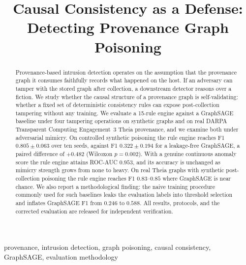 \documentclass[conference]{IEEEtran}
\begin{document}
\title{Causal Consistency as a Defense: Detecting Provenance Graph Poisoning}

\author{
}

\maketitle

\begin{abstract}
Provenance-based intrusion detection operates on the assumption that the
provenance graph it consumes faithfully records what happened on the host. If an
adversary can tamper with the stored graph after collection, a downstream
detector reasons over a fiction. We study whether the causal structure of a
provenance graph is self-validating: whether a fixed set of deterministic
consistency rules can expose post-collection tampering without any training.
We evaluate a 15-rule engine against a GraphSAGE baseline under four tampering
operations on synthetic graphs and on real DARPA Transparent Computing
Engagement~3 Theia provenance, and we examine both under adversarial mimicry.
On controlled synthetic poisoning the rule engine reaches F1
$0.805\pm0.063$ over ten seeds, against F1 $0.322\pm0.194$ for a leakage-free
GraphSAGE, a paired difference of $+0.482$ (Wilcoxon $p=0.002$). With a genuine
continuous anomaly score the rule engine attains ROC-AUC $0.953$, and its
accuracy is unchanged as mimicry strength grows from none to heavy. On real
Theia graphs with synthetic post-collection poisoning the rule engine reaches
F1 $0.83$--$0.85$ where GraphSAGE is near chance. We also report a methodological
finding: the naive training procedure commonly used for such baselines leaks the
evaluation labels into threshold selection and inflates GraphSAGE F1 from
$0.246$ to $0.588$. All results, protocols, and the corrected evaluation are
released for independent verification.
\end{abstract}

\begin{IEEEkeywords}
provenance, intrusion detection, graph poisoning, causal consistency,
GraphSAGE, evaluation methodology
\end{IEEEkeywords}
\end{document}
